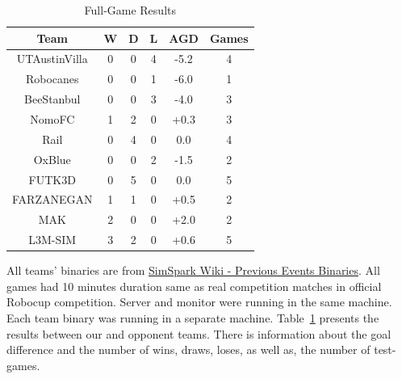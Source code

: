 \begin{table}[h]
\begin{center}
    \begin{tabular}{cccccc}
    \textbf{Team} 	& \textbf{W} & \textbf{D} & \textbf{L} & \textbf{AGD}\footnotemark 	& \textbf{Games}   \\
    \midrule
    UTAustinVilla 	& 0		& 0		& 4		& -5.2		& 4 			\\
    Robocanes 		& 0		& 0		& 1		& -6.0		& 1 			\\
    BeeStanbul		& 0		& 0		& 3		& -4.0		& 3				\\
    NomoFC 			& 1		& 2		& 0		& +0.3 		& 3 			\\
    Rail 			& 0		& 4		& 0		& 0.0 		& 4 			\\
    OxBlue 			& 0		& 0		& 2		& -1.5 		& 2 			\\
    FUTK3D 			& 0		& 5		& 0		& 0.0 		& 5 			\\
    FARZANEGAN 		& 1		& 1		& 0		& +0.5 		& 2 			\\
    MAK 			    & 2		& 0		& 0		& +2.0 		& 2 			\\
    L3M-SIM			& 3		& 2   	& 0		& +0.6 		& 5 			\\     
    \end{tabular}
\end{center}
\label{GameResults}
\caption{Full-Game Results}
\end{table}

All teams' binaries are from \href{http://simspark.sourceforge.net/binaries/RoboCup2011/}{SimSpark Wiki - Previous Events Binaries}.
All games had 10 minutes duration same as real competition matches in official Robocup competition. Server and monitor were running in the same machine\footnotemark. Each team binary was running in a separate machine\footnotemark . Table~\ref{GameResults} presents the results between our and opponent teams. There is information about the goal difference and the number of wins, draws, loses, as well as, the number of test-games.



